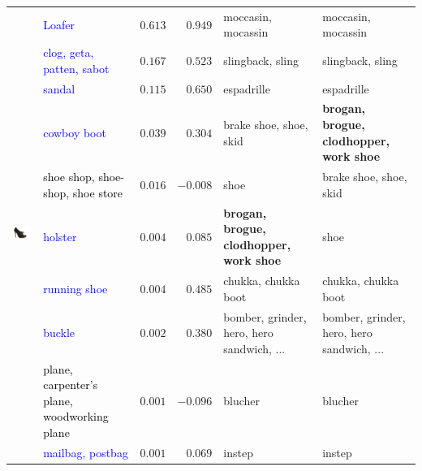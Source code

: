 \documentclass[11pt,letterpaper]{article}
\begin{document}
\begin{table}[t]
\begin{center}
\begin{small}
{\begin{tabular}{clrrll}
\midrule

\multirow{10}{*}{\includegraphics[height=10em]{n02904927_20825.JPEG}}
& \textcolor{blue}{Loafer} & $0.613$& $0.949$& moccasin, mocassin & moccasin, mocassin \\
& \textcolor{blue}{clog, geta, patten, sabot} & $0.167$& $0.523$& slingback, sling & slingback, sling \\
& \textcolor{blue}{sandal} & $0.115$& $0.650$& espadrille & espadrille \\
& \textcolor{blue}{cowboy boot} & $0.039$& $0.304$& brake shoe, shoe, skid & \textbf{brogan, brogue, clodhopper, work shoe} \\
& \textcolor{black}{shoe shop, shoe-shop, shoe store} & $0.016$& $-0.008$& shoe & brake shoe, shoe, skid \\
& \textcolor{blue}{holster} & $0.004$& $0.085$& \textbf{brogan, brogue, clodhopper, work shoe} & shoe \\
& \textcolor{blue}{running shoe} & $0.004$& $0.485$& chukka, chukka boot & chukka, chukka boot \\
& \textcolor{blue}{buckle} & $0.002$& $0.380$& bomber, grinder, hero, hero sandwich, ... & bomber, grinder, hero, hero sandwich, ... \\
& \textcolor{black}{plane, carpenter's plane, woodworking plane} & $0.001$& $-0.096$& blucher & blucher \\
& \textcolor{blue}{mailbag, postbag} & $0.001$& $0.069$& instep & instep \\

\midrule


\end{tabular}}
\end{small}
\end{center}
\end{table}
\end{document}
